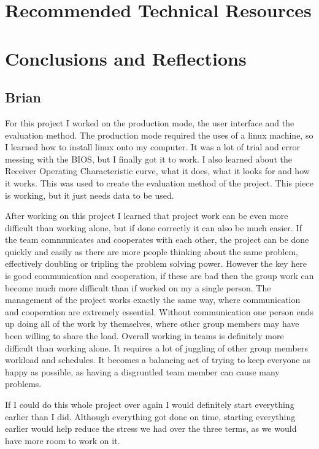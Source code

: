 \documentclass[onecolumn, draftclsnofoot,10pt, compsoc]{IEEEtran}
\begin{document}
	\section{Recommended Technical Resources}
	
	\section{Conclusions and Reflections}
	
	\subsection{Brian}
	For this project I worked on the production mode, the user interface and the evaluation method. The production mode required the uses of a linux machine, so I learned how to install linux onto my computer. It was a lot of trial and error messing with the BIOS, but I finally got it to work. I also learned about the Receiver Operating Characteristic curve, what it does, what it looks for and how it works. This was used to create the evaluation method of the project. This piece is working, but it just needs data to be used. 
	
	After working on this project I learned that project work can be even more difficult than working alone, but if done correctly it can also be much easier. If the team communicates and cooperates with each other, the project can be done quickly and easily as there are more people thinking about the same problem, effectively doubling or tripling the problem solving power. However the key here is good communication and cooperation, if these are bad then the group work can become much more difficult than if worked on my a single person. The management of the project works exactly the same way, where communication and cooperation are extremely essential. Without communication one person ends up doing all of the work by themselves, where other group members may have been willing to share the load. Overall working in teams is definitely more difficult than working alone. It requires a lot of juggling of other group members workload and schedules. It becomes a balancing act of trying to keep everyone as happy as possible, as having a disgruntled team member can cause many problems.
	
	If I could do this whole project over again I would definitely start everything earlier than I did. Although everything got done on time, starting everything earlier would help reduce the stress we had over the three terms, as we would have more room to work on it. 
	
\end{document}
